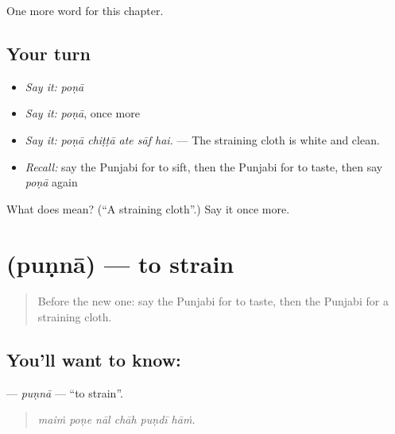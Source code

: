 \begin{grammarlens}[title={What you've built}]
One more word for this chapter.
\end{grammarlens}

\subsection*{Your turn}
\begin{itemize}
\raggedright
  \item \emph{Say it:} \emph{poṇā}
  \item \emph{Say it:} \emph{poṇā}, once more
  \item \emph{Say it:} \emph{poṇā chiṭṭā ate sāf hai.} — The straining cloth is white and clean.
  \item \emph{Recall:} say the Punjabi for to sift, then the Punjabi for to taste, then say \emph{poṇā} again
\end{itemize}

\begin{tcolorbox}[breakable,colback=teal!4,colframe=teal!35!black,title={Before you move on}]
What does  mean? (\textquotedblleft{}A straining cloth\textquotedblright{}.) Say it once more.
\end{tcolorbox}
\section[\texorpdfstring{\pa{ਪੁਣਨਾ} (puṇnā)}{ਪੁਣਨਾ (puṇnā)}]{ (puṇnā) — to strain}

\label{lesson:PA-C244-punna}



\begin{quote}
Before the new one: say the Punjabi for to taste, then the Punjabi for a straining cloth.
\end{quote}

\subsection*{You'll want to know: }
\textbf{} — \emph{puṇnā} — \textquotedblleft{}to strain\textquotedblright{}.

\begin{quote}
     
\end{quote}

\begin{quote}
\emph{maiṁ poṇe nāl chāh puṇdī hāṁ.}
\end{quote}

